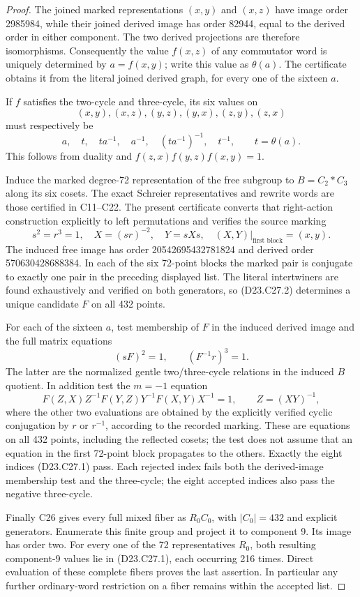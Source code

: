 \begin{proof}
The joined marked representations $(x,y)$ and $(x,z)$ have
image order 2985984, while their joined derived image has
order 82944, equal to the derived order in either component.
The two derived projections are therefore isomorphisms.
Consequently the value $f(x,z)$ of any commutator word is
uniquely determined by $a=f(x,y)$; write this value as
$\theta(a)$.  The certificate obtains it from the literal
joined derived graph, for every one of the sixteen $a$.

If $f$ satisfies the two-cycle and three-cycle, its six
values on
\[
       (x,y),(x,z),(y,z),(y,x),(z,y),(z,x)
\]
must respectively be
\[
 a,\quad t,\quad ta^{-1},\quad a^{-1},\quad
 (ta^{-1})^{-1},\quad t^{-1},\qquad t=\theta(a).
                                                               \tag{D23.C27.2}
\]
This follows from duality and
$f(z,x)f(y,z)f(x,y)=1$.

Induce the marked degree-72 representation of the free
subgroup to $B=C_2*C_3$ along its six cosets.  The exact
Schreier representatives and rewrite words are those
certified in C11--C22.  The present certificate converts
that right-action construction explicitly to left
permutations and verifies the source marking
\[
          s^2=r^3=1,\quad X=(sr)^{-2},\quad Y=sXs,
          \quad (X,Y)|_{\text{first block}}=(x,y).
\]
The induced free image has order 20542695432781824 and
derived order 570630428688384.  In each of the six
72-point blocks the marked pair is conjugate to exactly
one pair in the preceding displayed list.  The literal
intertwiners are found exhaustively and verified on both
generators, so (D23.C27.2) determines a unique candidate
$F$ on all 432 points.

For each of the sixteen $a$, test membership of $F$ in
the induced derived image and the full matrix equations
\[
             (sF)^2=1,\qquad(F^{-1}r)^3=1.
\]
The latter are the normalized gentle two/three-cycle
relations in the induced $B$ quotient.  In addition test
the $m=-1$ equation
\[
 F(Z,X)Z^{-1}F(Y,Z)Y^{-1}F(X,Y)X^{-1}=1,
 \qquad Z=(XY)^{-1},
\]
where the other two evaluations are obtained by the
explicitly verified cyclic conjugation by $r$ or $r^{-1}$,
according to the recorded marking.  These are equations
on all 432 points, including the reflected cosets; the
test does not assume that an equation in the first
72-point block propagates to the others.
Exactly the eight indices (D23.C27.1) pass.  Each rejected
index fails both the derived-image membership test and
the three-cycle; the eight accepted indices also pass
the negative three-cycle.

Finally C26 gives every full mixed fiber as
$R_0 C_0$, with $|C_0|=432$ and explicit generators.
Enumerate this finite group and project it to component 9.
Its image has order two.  For every one of the 72
representatives $R_0$, both resulting component-9 values
lie in (D23.C27.1), each occurring 216 times.  Direct
evaluation of these complete fibers proves the last
assertion.  In particular any further ordinary-word
restriction on a fiber remains within the accepted list.
\end{proof}

